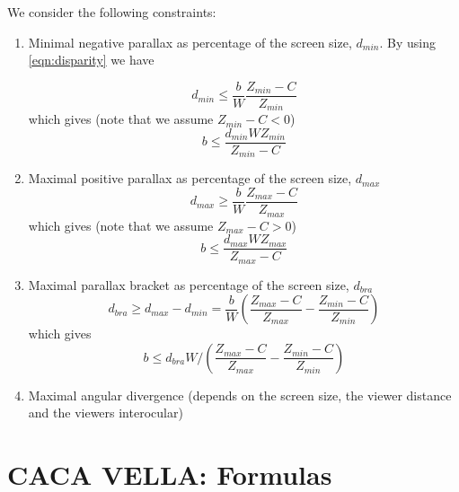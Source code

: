 \documentclass[12pt,a4paper]{article}
\begin{document}
We consider the following constraints:
\begin{enumerate}
 \item Minimal negative parallax as percentage of the screen size, $d_{min}$. By using \eqref{eqn:disparity} we have

 \begin{equation}
  d_{min} \leq  \frac{b}{W} \frac{Z_{min} - C}{Z_{min}}
 \end{equation}
 which gives (note that we assume $Z_{min} - C < 0$)
 \begin{equation}
 b \leq \frac{d_{min} W Z_{min}}{Z_{min} - C}
 \end{equation}
 
 \item Maximal positive parallax as percentage of the screen size, $d_{max}$
 \begin{equation}
  d_{max} \geq  \frac{b}{W} \frac{Z_{max} - C}{Z_{max}}
 \end{equation}
 which gives (note that we assume $Z_{max} - C > 0$)
 \begin{equation}
 b \leq \frac{d_{max} W Z_{max}}{Z_{max} - C}
 \end{equation}
 
 \item Maximal parallax bracket as percentage of the screen size, $d_{bra}$
 \begin{equation}
 d_{bra} \geq d_{max} - d_{min} = \frac{b}{W} \left(\frac{Z_{max} - C}{Z_{max}} - \frac{Z_{min} - C}{Z_{min}} \right)
 \end{equation}
 which gives
 \begin{equation}
 b \leq d_{bra} W \bigg/ \left( \frac{Z_{max} - C}{Z_{max}} - \frac{Z_{min} - C}{Z_{min}} \right)
 \end{equation}
  
 \item Maximal angular divergence (depends on the screen size, the viewer distance and the viewers interocular)
\end{enumerate}



\section{CACA VELLA: Formulas}
\end{document}
